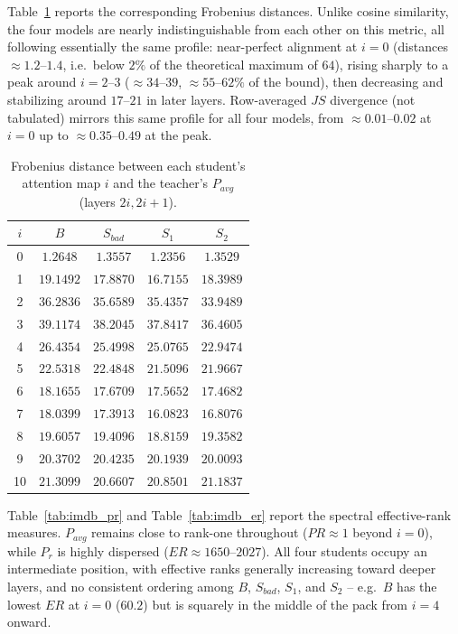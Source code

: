 \documentclass[conference]{IEEEtran}
\begin{document}
Table~\ref{tab:imdb_frobenius} reports the corresponding Frobenius distances. Unlike cosine similarity, the four models are nearly indistinguishable from each other on this metric, all following essentially the same profile: near-perfect alignment at $i=0$ (distances $\approx1.2$--$1.4$, i.e.\ below $2\%$ of the theoretical maximum of $64$), rising sharply to a peak around $i=2$--$3$ ($\approx34$--$39$, $\approx55$--$62\%$ of the bound), then decreasing and stabilizing around $17$--$21$ in later layers. Row-averaged $JS$ divergence (not tabulated) mirrors this same profile for all four models, from $\approx0.01$--$0.02$ at $i=0$ up to $\approx0.35$--$0.49$ at the peak.

\begin{table}[h!]
\centering
\caption{Frobenius distance between each student's attention map $i$ and the teacher's $P_{avg}$ (layers $2i,2i+1$).}
    \begin{tabular}{|c|c|c|c|c|}
        \hline
        $i$ & $B$ & $S_{bad}$ & $S_1$ & $S_2$ \\
        \hline
        0 & $1.2648$ & $1.3557$ & $1.2356$ & $1.3529$ \\
        1 & $19.1492$ & $17.8870$ & $16.7155$ & $18.3989$ \\
        2 & $36.2836$ & $35.6589$ & $35.4357$ & $33.9489$ \\
        3 & $39.1174$ & $38.2045$ & $37.8417$ & $36.4605$ \\
        4 & $26.4354$ & $25.4998$ & $25.0765$ & $22.9474$ \\
        5 & $22.5318$ & $22.4848$ & $21.5096$ & $21.9667$ \\
        6 & $18.1655$ & $17.6709$ & $17.5652$ & $17.4682$ \\
        7 & $18.0399$ & $17.3913$ & $16.0823$ & $16.8076$ \\
        8 & $19.6057$ & $19.4096$ & $18.8159$ & $19.3582$ \\
        9 & $20.3702$ & $20.4235$ & $20.1939$ & $20.0093$ \\
        10 & $21.3099$ & $20.6607$ & $20.8501$ & $21.1837$ \\
        \hline
    \end{tabular}
    \label{tab:imdb_frobenius}
\end{table}

Table~\ref{tab:imdb_pr} and Table~\ref{tab:imdb_er} report the spectral effective-rank measures. $P_{avg}$ remains close to rank-one throughout ($PR\approx1$ beyond $i=0$), while $P_r$ is highly dispersed ($ER\approx1650$--$2027$). All four students occupy an intermediate position, with effective ranks generally increasing toward deeper layers, and no consistent ordering among $B$, $S_{bad}$, $S_1$, and $S_2$ -- e.g.\ $B$ has the lowest $ER$ at $i=0$ ($60.2$) but is squarely in the middle of the pack from $i=4$ onward.
\end{document}
